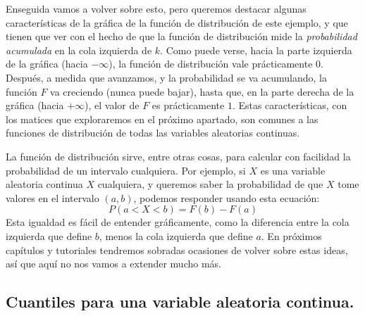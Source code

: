 Enseguida vamos a volver sobre esto, pero queremos destacar algunas características de la gráfica de la función de distribución de este ejemplo, y que tienen que ver con el hecho de que la función de distribución mide la {\em probabilidad acumulada} en la cola izquierda de $k$. Como puede verse, hacia la parte izquierda de la gráfica (hacia $-\infty$), la función de distribución vale prácticamente $0$. Después, a medida que avanzamos, y la probabilidad se va acumulando, la función $F$ va creciendo (nunca puede bajar), hasta que, en la parte derecha de la gráfica (hacia $+\infty$), el valor de $F$ es prácticamente $1$.  Estas características, con los matices que exploraremos en el próximo apartado, son comunes a las funciones de distribución de todas las variables aleatorias continuas.

La función de distribución sirve, entre otras cosas, para calcular con facilidad la probabilidad de un intervalo cualquiera. Por ejemplo, si $X$ es una variable aleatoria continua $X$ cualquiera, y queremos saber la probabilidad de que $X$ tome valores en el intervalo $(a,b)$, podemos responder usando esta ecuación:
\[P(a<X<b) = F(b) - F(a)\]
Esta igualdad es fácil de entender gráficamente, como la diferencia entre la cola izquierda que
define $b$, menos la cola izquierda que define $a$. En próximos capítulos y tutoriales tendremos
sobradas ocasiones de volver sobre estas ideas, así que aquí no nos vamos a extender mucho más.

\subsection{Cuantiles para una variable aleatoria continua.}
\label{cap05:subsec:CuantilesVariableContinua}

